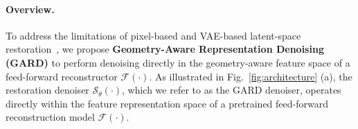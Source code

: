 \documentclass{llmxive}
\begin{document}
\paragraph{Overview.}
To address the limitations of pixel-based and VAE-based latent-space restoration~\cite{mao2025sir, kingma2013auto}, we propose \textbf{Geometry-Aware Representation Denoising (GARD)} to perform denoising directly in the geometry-aware feature space of a feed-forward reconstructor $\mathcal{F}(\cdot)$. 
As illustrated in Fig.~\ref{fig:architecture} (a), the restoration denoiser $\mathcal{S}_{\theta}(\cdot)$, which we refer to as the GARD denoiser, operates directly within the feature representation space of a pretrained feed-forward reconstruction model $\mathcal{F}(\cdot)$. 
\end{document}
